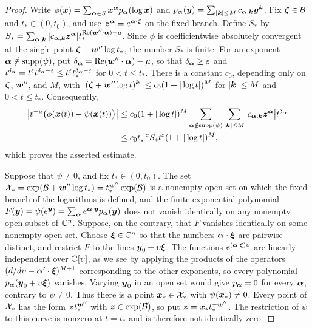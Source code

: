 \begin{proof}
	Write \(\phi(\boldsymbol{x}) = \sum_{\boldsymbol{\alpha}\in S}\boldsymbol{x}^{\boldsymbol{\alpha}}p_{\boldsymbol{\alpha}}(\log\boldsymbol{x})\) and \(p_{\boldsymbol{\alpha}}(\boldsymbol{y}) = \sum_{|\boldsymbol{k}|\leq M}c_{\boldsymbol{\alpha},\boldsymbol{k}}\boldsymbol{y}^{\boldsymbol{k}}\).
	Fix \(\boldsymbol{\zeta}\in\mathcal B\) and \(t_*\in(0,t_0)\), and use \(\boldsymbol{z}^{\boldsymbol{\alpha}}=e^{\boldsymbol{\alpha}\cdot\boldsymbol{\zeta}}\) on the fixed branch.
	Define \(S_*\) by \(S_*=\sum_{\boldsymbol{\alpha},\boldsymbol{k}}|c_{\boldsymbol{\alpha},\boldsymbol{k}}\boldsymbol{z}^{\boldsymbol{\alpha}}|t_*^{\operatorname{Re}(\boldsymbol{w}''\cdot\boldsymbol{\alpha})-\mu}\).
	Since \(\phi\) is coefficientwise absolutely convergent at the single point \(\boldsymbol{\zeta}+\boldsymbol{w}''\log t_*\), the number \(S_*\) is finite.
	For an exponent \(\boldsymbol{\alpha}\notin\operatorname{supp}(\psi)\), put \(\delta_{\boldsymbol{\alpha}} = \operatorname{Re}(\boldsymbol{w}''\cdot\boldsymbol{\alpha})-\mu\), so that \(\delta_{\boldsymbol{\alpha}}\geq\varepsilon\) and \(t^{\delta_{\boldsymbol{\alpha}}} = t^\varepsilon t^{\delta_{\boldsymbol{\alpha}}-\varepsilon} \leq t^\varepsilon t_*^{\delta_{\boldsymbol{\alpha}}-\varepsilon}\) for \(0<t\leq t_*\).
	There is a constant \(c_0\), depending only on \(\boldsymbol{\zeta}\), \(\boldsymbol{w}''\), and \(M\), with \(|(\boldsymbol{\zeta}+\boldsymbol{w}''\log t)^{\boldsymbol{k}}| \leq c_0(1+|\log t|)^M\) for \(|\boldsymbol{k}|\leq M\) and \(0<t\leq t_*\).
	Consequently,
	\[
		\begin{aligned}
			\left|
			t^{-\mu}\bigl(\phi(\boldsymbol{x}(t))-\psi(\boldsymbol{x}(t))\bigr)
			\right|
			&\leq
			c_0(1+|\log t|)^M
			\sum_{\boldsymbol{\alpha}\notin\operatorname{supp}(\psi)}
			\sum_{|\boldsymbol{k}|\leq M}
			\bigl|c_{\boldsymbol{\alpha},\boldsymbol{k}}\boldsymbol{z}^{\boldsymbol{\alpha}}\bigr|
			t^{\delta_{\boldsymbol{\alpha}}}\\
			&\leq
			c_0t_*^{-\varepsilon}S_*
			t^\varepsilon(1+|\log t|)^M,
		\end{aligned}
	\]
	which proves the asserted estimate.

	Suppose that \(\psi\ne0\), and fix \(t_*\in(0,t_0)\).
	The set \(\mathcal X_* = \exp(\mathcal B+\boldsymbol{w}''\log t_*) = t_*^{\boldsymbol{w}''}\exp(\mathcal B)\) is a nonempty open set on which the fixed branch of the logarithms is defined, and the finite exponential polynomial \(F(\boldsymbol{y}) = \psi(e^{\boldsymbol{y}}) = \sum_{\boldsymbol{\alpha}}e^{\boldsymbol{\alpha}\cdot\boldsymbol{y}}p_{\boldsymbol{\alpha}}(\boldsymbol{y})\) does not vanish identically on any nonempty open subset of \(\mathbb C^n\).
	Suppose, on the contrary, that \(F\) vanishes identically on some nonempty open set.
	Choose \(\boldsymbol{\xi}\in\mathbb C^n\) so that the numbers \(\boldsymbol{\alpha}\cdot\boldsymbol{\xi}\) are pairwise distinct, and restrict \(F\) to the lines \(\boldsymbol{y}_0+\upsilon\boldsymbol{\xi}\).
	The functions \(e^{(\boldsymbol{\alpha}\cdot\boldsymbol{\xi})\upsilon}\) are linearly independent over \(\mathbb C[\upsilon]\), as we see by applying the products of the operators \((d/d\upsilon-\boldsymbol{\alpha}'\cdot\boldsymbol{\xi})^{M+1}\) corresponding to the other exponents, so every polynomial \(p_{\boldsymbol{\alpha}}(\boldsymbol{y}_0+\upsilon\boldsymbol{\xi})\) vanishes.
	Varying \(\boldsymbol{y}_0\) in an open set would give \(p_{\boldsymbol{\alpha}}=0\) for every \(\boldsymbol{\alpha}\), contrary to \(\psi\ne0\).
	Thus there is a point \(\boldsymbol{x}_*\in\mathcal X_*\) with \(\psi(\boldsymbol{x}_*)\ne0\).
	Every point of \(\mathcal X_*\) has the form \(\boldsymbol{z} t_*^{\boldsymbol{w}''}\) with \(\boldsymbol{z}\in\exp(\mathcal B)\), so put \(\boldsymbol{z}=\boldsymbol{x}_*t_*^{-\boldsymbol{w}''}\).
	The restriction of \(\psi\) to this curve is nonzero at \(t=t_*\) and is therefore not identically zero.


\end{proof}
